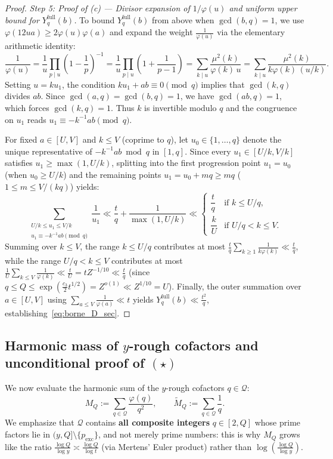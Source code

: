 \documentclass[11pt, a4paper]{article}
\theoremstyle{plain}
\theoremstyle{definition}
\begin{document}
\begin{proof}
\medskip\noindent
\emph{Step 5: Proof of (c) --- Divisor expansion of $1/\varphi(u)$ and uniform upper bound for $Y_q^{\mathrm{full}}(b)$.} To bound $Y_q^{\mathrm{full}}(b)$ from above when $\gcd(b, q) = 1$, we use $\varphi(12ua) \ge 2 \varphi(u)\varphi(a)$ and expand the weight $\frac{1}{\varphi(u)}$ via the elementary arithmetic identity:
\[
\frac{1}{\varphi(u)} = \frac{1}{u}\prod_{p \mid u}\left(1 - \frac{1}{p}\right)^{-1} = \frac{1}{u}\prod_{p \mid u}\left(1 + \frac{1}{p-1}\right) = \sum_{k \mid u} \frac{\mu^2(k)}{\varphi(k)\,u} = \sum_{k \mid u} \frac{\mu^2(k)}{k\varphi(k)\,(u/k)}.
\]
Setting $u = k u_1$, the condition $k u_1 + ab \equiv 0 \pmod q$ implies that $\gcd(k, q)$ divides $ab$. Since $\gcd(a, q) = \gcd(b, q) = 1$, we have $\gcd(ab, q) = 1$, which forces $\gcd(k, q) = 1$. Thus $k$ is invertible modulo $q$ and the congruence on $u_1$ reads $u_1 \equiv -k^{-1}ab \pmod q$.

For fixed $a \in [U, V]$ and $k \le V$ (coprime to $q$), let $u_0 \in \{1, \dots, q\}$ denote the unique representative of $-k^{-1}ab \bmod q$ in $[1, q]$. Since every $u_1 \in [U/k, V/k]$ satisfies $u_1 \ge \max(1, U/k)$, splitting into the first progression point $u_1 = u_0$ (when $u_0 \ge U/k$) and the remaining points $u_1 = u_0 + m q \ge m q$ ($1 \le m \le V/(kq)$) yields:
\[
\sum_{\substack{U/k \le u_1 \le V/k \\ u_1 \equiv -k^{-1}ab \pmod q}} \frac{1}{u_1} \ll \frac{t}{q} + \frac{1}{\max(1, U/k)} \ll \begin{cases}
\dfrac{t}{q} & \text{if } k \le U/q, \\[8pt]
\dfrac{k}{U} & \text{if } U/q < k \le V.
\end{cases}
\]
Summing over $k \le V$, the range $k \le U/q$ contributes at most $\frac{t}{q} \sum_{k \ge 1} \frac{1}{k\varphi(k)} \ll \frac{t}{q}$, while the range $U/q < k \le V$ contributes at most $\frac{1}{U} \sum_{k \le V} \frac{1}{\varphi(k)} \ll \frac{t}{U} = t Z^{-1/10} \ll \frac{t}{q}$ (since $q \le Q \le \exp(\frac{c_3}{2} t^{1/2}) = Z^{o(1)} \ll Z^{1/10} = U$). Finally, the outer summation over $a \in [U, V]$ using $\sum_{a \le V} \frac{1}{\varphi(a)} \ll t$ yields $Y_q^{\mathrm{full}}(b) \ll \frac{t^2}{q}$, establishing~\eqref{eq:borne_D_sec}.
\end{proof}

\subsection{Harmonic mass of $y$-rough cofactors and unconditional proof of $(\star)$}\label{subsec:preuve_star_complete}
We now evaluate the harmonic sum of the $y$-rough cofactors $q \in \mathcal{Q}$:
\begin{equation}\label{eq:def_MQ_sec}
M_Q := \sum_{q \in \mathcal{Q}} \frac{\varphi(q)}{q^2}, \qquad \widetilde{M}_Q := \sum_{q \in \mathcal{Q}} \frac{1}{q}.
\end{equation}
We emphasize that $\mathcal{Q}$ contains \textbf{all composite integers} $q \in [2, Q]$ whose prime factors lie in $(y, Q] \setminus \{p_{\mathrm{exc}}\}$, and not merely prime numbers: this is why $M_Q$ grows like the ratio $\frac{\log Q}{\log y} \asymp \frac{\log Q}{\log t}$ (via Mertens' Euler product) rather than $\log\left(\frac{\log Q}{\log y}\right)$.
\end{document}
